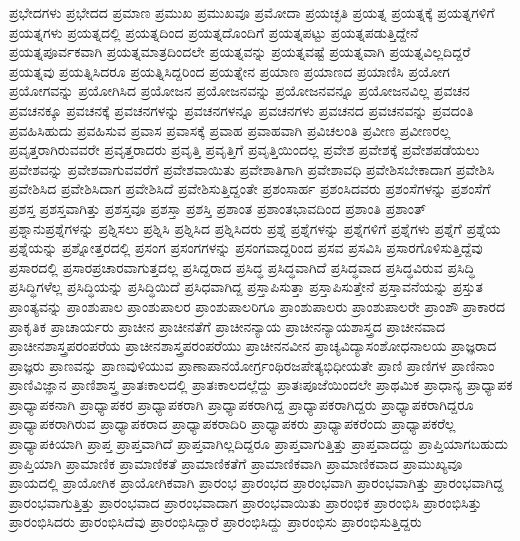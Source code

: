 {ಪ್ರಭೇದಗಳು
ಪ್ರಭೇದದ
ಪ್ರಮಾಣ
ಪ್ರಮುಖ
ಪ್ರಮುಖವೂ
ಪ್ರಮೋದಾ
ಪ್ರಯಚ್ಛತಿ
ಪ್ರಯತ್ನ
ಪ್ರಯತ್ನಕ್ಕೆ
ಪ್ರಯತ್ನಗಳಿಗೆ
ಪ್ರಯತ್ನಗಳು
ಪ್ರಯತ್ನದಲ್ಲಿ
ಪ್ರಯತ್ನದಿಂದ
ಪ್ರಯತ್ನದೊಂದಿಗೆ
ಪ್ರಯತ್ನಪಟ್ಟು
ಪ್ರಯತ್ನಪಡುತ್ತಿದ್ದೇನೆ
ಪ್ರಯತ್ನಪೂರ್ವಕವಾಗಿ
ಪ್ರಯತ್ನಮಾತ್ರದಿಂದಲೇ
ಪ್ರಯತ್ನವನ್ನು
ಪ್ರಯತ್ನವಷ್ಟೆ
ಪ್ರಯತ್ನವಾಗಿ
ಪ್ರಯತ್ನವಿಲ್ಲದಿದ್ದರೆ
ಪ್ರಯತ್ನವು
ಪ್ರಯತ್ನಿಸಿದರೂ
ಪ್ರಯತ್ನಿಸಿದ್ದರಿಂದ
ಪ್ರಯತ್ನೇನ
ಪ್ರಯಾಣ
ಪ್ರಯಾಣದ
ಪ್ರಯಾಣಿಸಿ
ಪ್ರಯೋಗ
ಪ್ರಯೋಗವನ್ನು
ಪ್ರಯೋಗಿಸಿದ
ಪ್ರಯೋಜನ
ಪ್ರಯೋಜನವನ್ನು
ಪ್ರಯೋಜನವನ್ನೂ
ಪ್ರಯೋಜನವಿಲ್ಲ
ಪ್ರವಚನ
ಪ್ರವಚನಕ್ಕೂ
ಪ್ರವಚನಕ್ಕೆ
ಪ್ರವಚನಗಳನ್ನು
ಪ್ರವಚನಗಳನ್ನೂ
ಪ್ರವಚನಗಳು
ಪ್ರವಚನದ
ಪ್ರವಚನವನ್ನು
ಪ್ರವದಂತಿ
ಪ್ರವಹಿಸಿಹುದು
ಪ್ರವಹಿಸುವ
ಪ್ರವಾಸ
ಪ್ರವಾಸಕ್ಕೆ
ಪ್ರವಾಹ
ಪ್ರವಾಹವಾಗಿ
ಪ್ರವಿಚಲಂತಿ
ಪ್ರವೀಣ
ಪ್ರವೀಣರಲ್ಲ
ಪ್ರವೃತ್ತರಾಗಿರುವವರೇ
ಪ್ರವೃತ್ತರಾದರು
ಪ್ರವೃತ್ತಿ
ಪ್ರವೃತ್ತಿಗೆ
ಪ್ರವೃತ್ತಿಯಿಂದಲ್ಲ
ಪ್ರವೇಶ
ಪ್ರವೇಶಕ್ಕೆ
ಪ್ರವೇಶಪಡೆಯಲು
ಪ್ರವೇಶವನ್ನು
ಪ್ರವೇಶವಾಗುವವರೆಗೆ
ಪ್ರವೇಶವಾಯಿತು
ಪ್ರವೇಶಾತಿಗಾಗಿ
ಪ್ರವೇಶಾವಧಿ
ಪ್ರವೇಶಿಸಬೇಕಾದಾಗ
ಪ್ರವೇಶಿಸಿ
ಪ್ರವೇಶಿಸಿದ
ಪ್ರವೇಶಿಸಿದಾಗ
ಪ್ರವೇಶಿಸಿದೆ
ಪ್ರವೇಶಿಸುತ್ತಿದ್ದಂತೇ
ಪ್ರಶಂಸಾರ್ಹ
ಪ್ರಶಂಸಿದವರು
ಪ್ರಶಂಸೆಗಳನ್ನು
ಪ್ರಶಂಸೆಗೆ
ಪ್ರಶಸ್ತ
ಪ್ರಶಸ್ತವಾಗಿತ್ತು
ಪ್ರಶಸ್ತವೂ
ಪ್ರಶಸ್ತಾ
ಪ್ರಶಸ್ತಿ
ಪ್ರಶಾಂತ
ಪ್ರಶಾಂತಭಾವದಿಂದ
ಪ್ರಶಾಂತಿ
ಪ್ರಶಾಂತ್
ಪ್ರಶ್ನಾನುಪ್ರಶ್ನೆಗಳನ್ನು
ಪ್ರಶ್ನಿಸಲು
ಪ್ರಶ್ನಿಸಿ
ಪ್ರಶ್ನಿಸಿದ
ಪ್ರಶ್ನಿಸಿದರು
ಪ್ರಶ್ನೆ
ಪ್ರಶ್ನೆಗಳನ್ನು
ಪ್ರಶ್ನೆಗಳಿಗೆ
ಪ್ರಶ್ನೆಗಳು
ಪ್ರಶ್ನೆಗೆ
ಪ್ರಶ್ನೆಯ
ಪ್ರಶ್ನೆಯನ್ನು
ಪ್ರಶ್ನೋತ್ತರದಲ್ಲಿ
ಪ್ರಸಂಗ
ಪ್ರಸಂಗಗಳನ್ನು
ಪ್ರಸಂಗವಾದ್ದರಿಂದ
ಪ್ರಸವ
ಪ್ರಸವಿಸಿ
ಪ್ರಸಾರಗೊಳಿಸುತ್ತಿದ್ದೆವು
ಪ್ರಸಾರದಲ್ಲಿ
ಪ್ರಸಾರಪ್ರಚಾರವಾಗುತ್ತದಲ್ಲ
ಪ್ರಸಿದ್ದರಾದ
ಪ್ರಸಿದ್ಧ
ಪ್ರಸಿದ್ಧವಾಗಿದೆ
ಪ್ರಸಿದ್ಧವಾದ
ಪ್ರಸಿದ್ಧವಿರುವ
ಪ್ರಸಿದ್ಧಿ
ಪ್ರಸಿದ್ಧಿಗಳೆಲ್ಲ
ಪ್ರಸಿದ್ಧಿಯನ್ನು
ಪ್ರಸಿದ್ಧಿಯಿದೆ
ಪ್ರಸಿಧವಾಗಿದ್ದ
ಪ್ರಸ್ತಾಪಿಸುತ್ತಾ
ಪ್ರಸ್ತಾಪಿಸುತ್ತೇನೆ
ಪ್ರಸ್ತಾವನೆಯನ್ನು
ಪ್ರಸ್ತುತ
ಪ್ರಾಂತ್ಯವನ್ನು
ಪ್ರಾಂಶುಪಾಲ
ಪ್ರಾಂಶುಪಾಲರ
ಪ್ರಾಂಶುಪಾಲರಿಗೂ
ಪ್ರಾಂಶುಪಾಲರು
ಪ್ರಾಂಶುಪಾಲರೇ
ಪ್ರಾಂಶೌ
ಪ್ರಾಕಾರದ
ಪ್ರಾಕೃತಿಕ
ಪ್ರಾಚಾರ್ಯರು
ಪ್ರಾಚೀನ
ಪ್ರಾಚೀನತೆಗೆ
ಪ್ರಾಚೀನನ್ಯಾಯ
ಪ್ರಾಚೀನನ್ಯಾಯಶಾಸ್ತ್ರದ
ಪ್ರಾಚೀನವಾದ
ಪ್ರಾಚೀನಶಾಸ್ತ್ರಪರಂಪರೆಯ
ಪ್ರಾಚೀನಶಾಸ್ತ್ರಪರಂಪರೆಯು
ಪ್ರಾಚೀನನವೀನ
ಪ್ರಾಚ್ಯವಿದ್ಯಾಸಂಶೋಧನಾಲಯ
ಪ್ರಾಜ್ಞರಾದ
ಪ್ರಾಜ್ಞರು
ಪ್ರಾಣವನ್ನು
ಪ್ರಾಣವುಳಿಯುವ
ಪ್ರಾಣಾಪಾನಯೋರ್ಗ್ರಂಥಿರಜಪೇತ್ಯಭಿಧೀಯತೇ
ಪ್ರಾಣಿ
ಪ್ರಾಣಿಗಳ
ಪ್ರಾಣಿನಾಂ
ಪ್ರಾಣಿವಿಜ್ಞಾನ
ಪ್ರಾಣಿಶಾಸ್ತ್ರ
ಪ್ರಾತಃಕಾಲದಲ್ಲಿ
ಪ್ರಾತಃಕಾಲದಲ್ಲೆದ್ದು
ಪ್ರಾತಃಪೂಜೆಯಿಂದಲೇ
ಪ್ರಾಥಮಿಕ
ಪ್ರಾಧಾನ್ಯ
ಪ್ರಾಧ್ಯಾಪಕ
ಪ್ರಾಧ್ಯಾಪಕನಾಗಿ
ಪ್ರಾಧ್ಯಾಪಕರ
ಪ್ರಾಧ್ಯಾಪಕರಾಗಿ
ಪ್ರಾಧ್ಯಾಪಕರಾಗಿದ್ದ
ಪ್ರಾಧ್ಯಾಪಕರಾಗಿದ್ದರು
ಪ್ರಾಧ್ಯಾಪಕರಾಗಿದ್ದರೂ
ಪ್ರಾಧ್ಯಾಪಕರಾಗಿರುವ
ಪ್ರಾಧ್ಯಾಪಕರಾದ
ಪ್ರಾಧ್ಯಾಪಕರಾದಿರಿ
ಪ್ರಾಧ್ಯಾಪಕರು
ಪ್ರಾಧ್ಯಾಪಕರೆಂದು
ಪ್ರಾಧ್ಯಾಪಕರೆಲ್ಲ
ಪ್ರಾಧ್ಯಾಪಕಿಯಾಗಿ
ಪ್ರಾಪ್ತ
ಪ್ರಾಪ್ತವಾಗಿದೆ
ಪ್ರಾಪ್ತವಾಗಿಲ್ಲದಿದ್ದರೂ
ಪ್ರಾಪ್ತವಾಗುತ್ತಿತ್ತು
ಪ್ರಾಪ್ತವಾದದ್ದು
ಪ್ರಾಪ್ತಿಯಾಗಬಹುದು
ಪ್ರಾಪ್ತಿಯಾಗಿ
ಪ್ರಾಮಾಣಿಕ
ಪ್ರಾಮಾಣಿಕತೆ
ಪ್ರಾಮಾಣಿಕತೆಗೆ
ಪ್ರಾಮಾಣಿಕವಾಗಿ
ಪ್ರಾಮಾಣಿಕವಾದ
ಪ್ರಾಮುಖ್ಯವೂ
ಪ್ರಾಯದಲ್ಲಿ
ಪ್ರಾಯೋಗಿಕ
ಪ್ರಾಯೋಗಿಕವಾಗಿ
ಪ್ರಾರಂಭ
ಪ್ರಾರಂಭದ
ಪ್ರಾರಂಭವಾಗಿ
ಪ್ರಾರಂಭವಾಗಿತ್ತು
ಪ್ರಾರಂಭವಾಗಿದ್ದ
ಪ್ರಾರಂಭವಾಗುತ್ತಿತ್ತು
ಪ್ರಾರಂಭವಾದ
ಪ್ರಾರಂಭವಾದಾಗ
ಪ್ರಾರಂಭವಾಯಿತು
ಪ್ರಾರಂಭಿಕ
ಪ್ರಾರಂಭಿಸಿ
ಪ್ರಾರಂಭಿಸಿತ್ತು
ಪ್ರಾರಂಭಿಸಿದರು
ಪ್ರಾರಂಭಿಸಿದೆವು
ಪ್ರಾರಂಭಿಸಿದ್ದಾರೆ
ಪ್ರಾರಂಭಿಸಿದ್ದು
ಪ್ರಾರಂಭಿಸು
ಪ್ರಾರಂಭಿಸುತ್ತಿದ್ದರು
}
